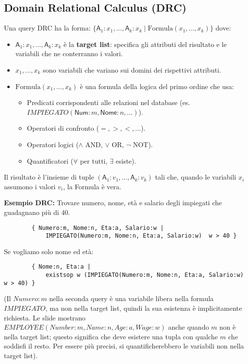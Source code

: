 \documentclass{article}
\newcommand{\Rel}[1]{\textit{#1}} %
\newcommand{\Attr}[1]{\textsf{#1}} %
\newcommand{\mylandop}{\wedge}
\newcommand{\myvel}{\vee}
\newcommand{\mynegop}{\neg}
\newcommand{\myforallop}{\forall}
\newcommand{\myexistsop}{\exists}
\begin{document}
	\subsection{Domain Relational Calculus (DRC)}
	Una query DRC ha la forma:
	$\{ \Attr{A}_1:x_1, \dots, \Attr{A}_k:x_k \mid \text{Formula}(x_1, \dots, x_k) \}$
	dove:
	\begin{itemize}
		\item $\Attr{A}_1:x_1, \dots, \Attr{A}_k:x_k$ è la \textbf{target list}: specifica gli attributi del risultato e le variabili che ne conterranno i valori.
		\item $x_1, \dots, x_k$ sono variabili che variano sui domini dei rispettivi attributi.
		\item $\text{Formula}(x_1, \dots, x_k)$ è una formula della logica del primo ordine che usa:
		\begin{itemize}
			\item Predicati corrispondenti alle relazioni nel database (es. $\Rel{IMPIEGATO}(\Attr{Num}:m, \Attr{Nome}:n, \dots)$).
			\item Operatori di confronto ($=, >, <, \dots$).
			\item Operatori logici ($\mylandop$ AND, $\myvel$ OR, $\mynegop$ NOT).
			\item Quantificatori ($\myforallop$ per tutti, $\myexistsop$ esiste).
		\end{itemize}
	\end{itemize}
	Il risultato è l'insieme di tuple $(\Attr{A}_1:v_1, \dots, \Attr{A}_k:v_k)$ tali che, quando le variabili $x_i$ assumono i valori $v_i$, la Formula è vera.
	
	\textbf{Esempio DRC:} Trovare numero, nome, età e salario degli impiegati che guadagnano più di 40.
	\begin{verbatim}
		{ Numero:m, Nome:n, Eta:a, Salario:w |
			IMPIEGATO(Numero:m, Nome:n, Eta:a, Salario:w)  w > 40 }
	\end{verbatim}
	Se vogliamo solo nome ed età:
	\begin{verbatim}
		{ Nome:n, Eta:a |
			existsop w (IMPIEGATO(Numero:m, Nome:n, Eta:a, Salario:w)  w > 40) }
	\end{verbatim}
	(Il $Numero:m$ nella seconda query è una variabile libera nella formula $IMPIEGATO$, ma non nella target list, quindi la sua esistenza è implicitamente richiesta. Le slide mostrano $EMPLOYEE(Number:m, Name:n, Age:a, Wage:w)$ anche quando $m$ non è nella target list; questo significa che deve esistere una tupla con qualche $m$ che soddisfi il resto. Per essere più precisi, si quantificherebbero le variabili non nella target list).
	
\end{document}
